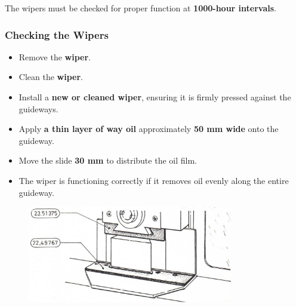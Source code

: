 

\setcounter{section}{31}

The wipers must be checked for proper function at \textbf{1000-hour intervals}.

\subsubsection*{Checking the Wipers}
\begin{itemize}
    \item Remove the \textbf{wiper}.
    \item Clean the \textbf{wiper}.
\end{itemize}


\begin{itemize}
    \item Install a \textbf{new or cleaned wiper}, ensuring it is firmly pressed against the guideways.
    \item Apply \textbf{a thin layer of way oil} approximately \textbf{50 mm wide} onto the guideway.
    \item Move the slide \textbf{30 mm} to distribute the oil film.\footnotemark[1]
    \item The wiper is functioning correctly if it removes oil evenly along the entire guideway.
\end{itemize}

\begin{figure}[H]
    \centering
    \includegraphics[width=0.8\textwidth]{images/chapter7/guideway_wiper_diagram.jpg}
    \label{fig:guideway_wiper}
\end{figure}


